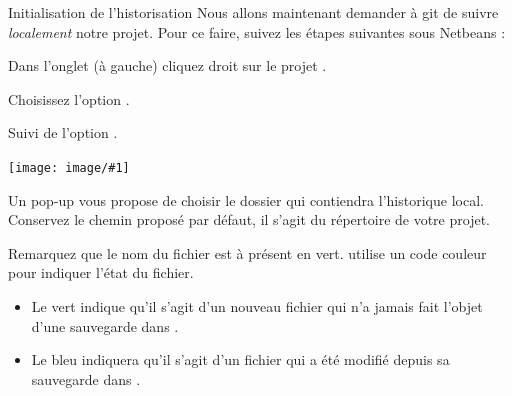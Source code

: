 \documentclass[a4paper,11pt]{style-esi/td}
\newcommand{\image}[2]{{\par\centering \texttt{[image: image/\#1]}\par}
}
\begin{document}
\begin{Tutoriel}{Initialisation de l'historisation}
	Nous allons maintenant demander à git de suivre \emph{localement} notre projet.
	Pour ce faire, suivez les étapes suivantes sous Netbeans :
	\begin{steps}
	\item
		Dans l'onglet  (à gauche) 
		cliquez droit sur le projet .
	\item 
		Choisissez l'option .
	\item 
		Suivi de l'option .
		\image{NetBeans_Push01}{6cm}
	\item 
		Un pop-up vous propose de choisir le dossier 
		qui contiendra l'historique local.
		Conservez le chemin proposé par défaut, 
		il s'agit du répertoire de votre projet.
	\end{steps}
\end{Tutoriel}

Remarquez que le nom du fichier 
est à présent en vert.
 utilise un code couleur pour indiquer l'état du fichier.
\begin{itemize}
\item 
	Le {\color{green!50!black} vert}
	indique qu'il s'agit d'un nouveau fichier qui n'a jamais 
	fait l'objet d'une sauvegarde dans .
\item 
	Le {\color{blue} bleu}
	indiquera qu'il s'agit d'un fichier qui a été modifié
	depuis sa sauvegarde dans .
\end{itemize}
\end{document}
